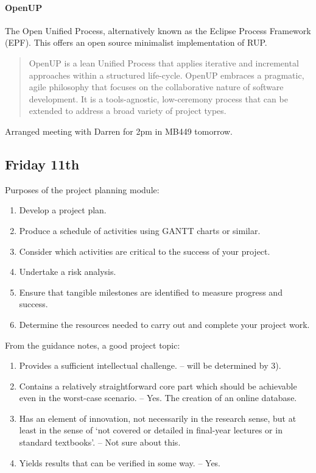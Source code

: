 \paragraph{OpenUP} The Open Unified Process, alternatively known as the Eclipse
Process Framework (EPF). This offers an open source minimalist implementation of
RUP.

\begin{quote}
  OpenUP is a lean Unified Process that applies iterative and incremental
  approaches within a structured life-cycle. OpenUP embraces a pragmatic, agile
  philosophy that focuses on the collaborative nature of software
  development. It is a tools-agnostic, low-ceremony process that can be extended
  to address a broad variety of project types.
\end{quote}

\noindent
Arranged meeting with Darren for 2pm in MB449 tomorrow.

\subsection{Friday 11th}
Purposes of the project planning module:

\begin{enumerate}
\item Develop a project plan.
\item Produce a schedule of activities using GANTT charts or similar.
\item Consider which activities are critical to the success of your project.
\item Undertake a risk analysis.
\item Ensure that tangible milestones are identified to measure progress and
  success.
\item Determine the resources needed to carry out and complete your project
  work.
\end{enumerate}

\noindent
From the guidance notes, a good project topic:

\begin{enumerate}
\item Provides a sufficient intellectual challenge. – will be determined by 3).
\item Contains a relatively straightforward core part which should be achievable
  even in the worst-case scenario. – Yes. The creation of an online database.
\item Has an element of innovation, not necessarily in the research sense, but
  at least in the sense of ‘not covered or detailed in final-year lectures or in
  standard textbooks'. – Not sure about this.
\item Yields results that can be verified in some way. – Yes.
\end{enumerate}

